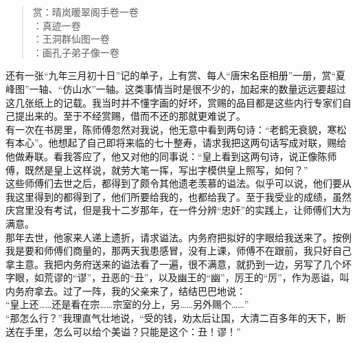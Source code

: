\begin{quote}
	赏：晴岚暖翠阁手卷一卷\\

：真迹一卷\\

：王洞群仙图一卷\\

：画孔子弟子像一卷\\
\end{quote}

还有一张“九年三月初十日”记的单子，上有赏、每人“唐宋名臣相册”一册，赏“夏峰图”一轴、“仿山水”一轴。这类事情当时是很不少的，加起来的数量远远要超过这几张纸上的记载。我当时并不懂字画的好坏，赏赐的品目都是这些内行专家们自己提出来的。至于不经赏赐，借而不还的那就更难说了。\\

有一次在书房里，陈师傅忽然对我说，他无意中看到两句诗：“老鹤无衰貌，寒松有本心”。他想起了自己即将来临的七十整寿，请求我把这两句话写成对联，赐给他做寿联。看我答应了，他又对他的同事说：“皇上看到这两句诗，说正像陈师傅，既然是皇上这样说，就劳大笔一挥，写出字模供皇上照写，如何？”\\

这些师傅们去世之后，都得到了颇令其他遗老羡慕的谥法。似乎可以说，他们要从我这里得到的都得到了，他们所要给我的，也都给我了。至于我受业的成绩，虽然庆宫里没有考试，但是我十二岁那年，在一件分辨“忠奸”的实践上，让师傅们大为满意。\\

那年去世，他家来人递上遗折，请求谥法。内务府把拟好的字眼给我送来了。按例我是要和师傅们商量的，那两天我患感冒，没有上课，师傅不在跟前，我只好自己拿主意。我把内务府送来的谥法看了一遍，很不满意，就扔到一边，另写了几个坏字眼，如荒谬的“谬”，丑恶的“丑”，以及幽王的“幽”，厉王的“厉”，作为恶谥，叫内务府拿去。过了一阵，我的父亲来了，结结巴巴地说：\\

“皇上还……还是看在宗……宗室的分上，另……另外赐个……”\\

“那怎么行？”我理直气壮地说，“受的钱，劝太后让国，大清二百多年的天下，断送在手里，怎么可以给个美谥？只能是这个：丑！谬！”\\

